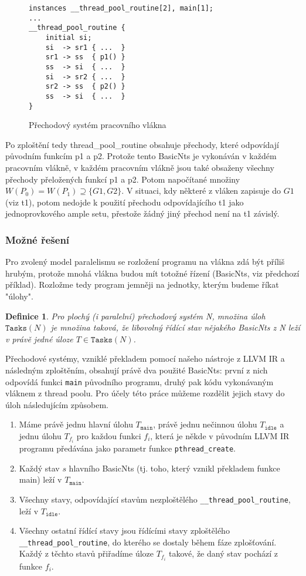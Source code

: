\documentclass[10pt,a4paper,notitlepage]{report}
\newtheorem{definition}{Definice}
\begin{document}
\begin{figure}
\begin{lstlisting}
instances __thread_pool_routine[2], main[1];
...
__thread_pool_routine {
	initial	si;
	si  -> sr1 { ...  }
	sr1 -> ss  { p1() }
	ss  -> si  { ...  }
	si  -> sr2 { ...  }
	sr2 -> ss  { p2() }
	ss  -> si  { ...  }
}
\end{lstlisting}
\caption{Přechodový systém pracovního vlákna}
\end{figure}

Po zploštění tedy thread\_pool\_routine obsahuje přechody, které odpovídají původním funkcím p1 a p2. Protože tento BasicNts je vykonáván v každém pracovním vlákně, v každém pracovním vlákně jsou také obsaženy všechny přechody přeložených funkcí p1 a p2. Potom napočítané množiny $W(P_0) = W(P_1) \supseteq \{ G1, G2\}$. V situaci, kdy některé z vláken zapisuje do $G1$ (viz t1), potom nedojde k použití přechodu odpovídajícího t1 jako jednoprovkového ample setu, přestože žádný jiný přechod není na t1 závislý. 

\subsubsection{Možné řešení}
Pro zvolený model paralelismu se rozložení programu na vlákna zdá být příliš hrubým, protože mnohá vlákna budou mít totožné řízení (BasicNts, viz předchozí příklad). Rozložme tedy program jemněji na jednotky, kterým budeme říkat "úlohy".

\begin{definition}
Pro plochý (i paralelní) přechodový systém N, množina úloh $\texttt{Tasks}(N)$ je množina taková, že libovolný řídící stav nějakého BasicNts z N leží v právě jedné úloze $T \in \texttt{Tasks}(N)$.
\end{definition}

Přechodové systémy, vzniklé překladem pomocí našeho nástroje z LLVM IR a následným zploštěním, obsahují právě dva použité BasicNts: první z nich odpovídá funkci \texttt{main} původního programu, druhý pak kódu vykonávaným vláknem z thread poolu. Pro účely této práce můžeme rozdělit jejich stavy do úloh následujícím způsobem.

\begin{enumerate}
\item Máme právě jednu hlavní úlohu $T_{\texttt{main}}$, právě jednu nečinnou úlohu $T_{\texttt{idle}}$ a jednu úlohu $T_{f_i}$ pro každou funkci $f_i$, která je někde v původním LLVM IR programu předávána jako parametr funkce \texttt{pthread\_create}.
\item Každý stav $s$ hlavního BasicNts (tj. toho, který vznikl překladem funkce main) leží v $T_{\texttt{main}}$.
\item Všechny stavy, odpovídající stavům nezploštělého \texttt{\_\_thread\_pool\_routine}, leží v $T_{\texttt{idle}}$.
\item Všechny ostatní řídící stavy jsou řídícími stavy zploštělého \texttt{\_\_thread\_pool\_routine}, do kterého se dostaly během fáze zplošťování. Každý z těchto stavů přiřadíme úloze $T_{f_i}$ takové, že daný stav pochází z funkce $f_i$.
\end{enumerate}
\end{document}
